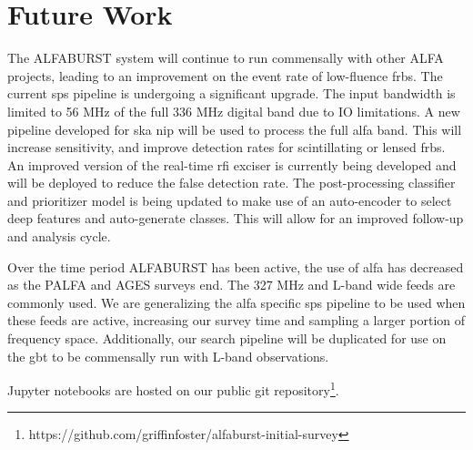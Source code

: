 \documentclass[a4paper,fleqn,usenatbib]{mnras}
\begin{document}
\section{Future Work}
\label{sec:future_work}

The ALFABURST system will continue to run commensally with other ALFA projects,
leading to an improvement on the event rate of low-fluence \glspl{frb}.  The
current \gls{sps} pipeline is undergoing a significant upgrade. The input
bandwidth is limited to 56 MHz of the full 336 MHz digital band due to IO
limitations. A new pipeline developed for \gls{ska} \gls{nip} will be used to
process the full \gls{alfa} band.  This will increase sensitivity, and improve
detection rates for scintillating or lensed \glspl{frb}.  An improved version of
the real-time \gls{rfi} exciser is currently being developed and will be
deployed to reduce the false detection rate. The post-processing classifier and
prioritizer model is being updated to make use of an auto-encoder to select deep
features and auto-generate classes. This will allow for an improved follow-up
and analysis cycle.

Over the time period ALFABURST has been active, the use of \gls{alfa} has
decreased as the PALFA and AGES surveys end. The 327 MHz and L-band wide feeds
are commonly used. We are generalizing the \gls{alfa} specific \gls{sps}
pipeline to be used when these feeds are active, increasing our survey time and
sampling a larger portion of frequency space. Additionally, our search pipeline
will be duplicated for use on the \gls{gbt} to be commensally run with L-band
observations. 

Jupyter notebooks are hosted on our public git
repository\footnote{https://github.com/griffinfoster/alfaburst-initial-survey}.


 

\bsp	%
\label{lastpage}
\end{document}

